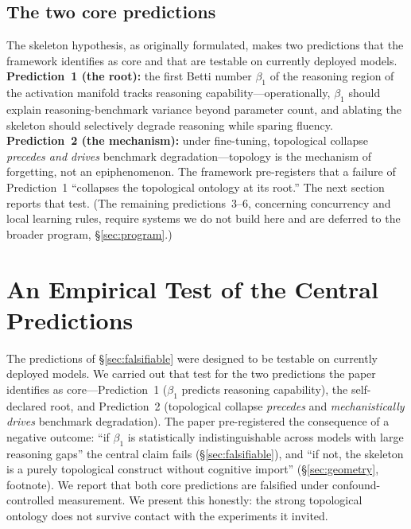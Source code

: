 \documentclass{article}
\begin{document}
\subsection{The two core predictions}
\label{sec:geometry-predictions}
The skeleton hypothesis, as originally formulated, makes two predictions that the framework
identifies as core and that are testable on currently deployed models. \textbf{Prediction~1 (the
root):} the first Betti number $\beta_1$ of the reasoning region of the activation manifold tracks
reasoning capability---operationally, $\beta_1$ should explain reasoning-benchmark variance beyond
parameter count, and ablating the skeleton should selectively degrade reasoning while sparing fluency.
\textbf{Prediction~2 (the mechanism):} under fine-tuning, topological collapse \emph{precedes and
drives} benchmark degradation---topology is the mechanism of forgetting, not an epiphenomenon. The
framework pre-registers that a failure of Prediction~1 ``collapses the topological ontology at its
root.'' The next section reports that test. (The remaining predictions~3--6, concerning concurrency
and local learning rules, require systems we do not build here and are deferred to the broader program,
\S\ref{sec:program}.)

\section{An Empirical Test of the Central Predictions}
\label{sec:empirical}

The predictions of \S\ref{sec:falsifiable} were designed to be testable on currently
deployed models. We carried out that test for the two predictions the paper identifies as
core---Prediction~1 (\(\beta_1\) predicts reasoning capability), the self-declared root, and
Prediction~2 (topological collapse \emph{precedes} and \emph{mechanistically drives} benchmark
degradation). The paper pre-registered the consequence of a negative outcome: ``if \(\beta_1\)
is statistically indistinguishable across models with large reasoning gaps'' the central claim
fails (\S\ref{sec:falsifiable}), and ``if not, the skeleton is a purely topological construct
without cognitive import'' (\S\ref{sec:geometry}, footnote). We report that both core
predictions are falsified under confound-controlled measurement. We present this honestly: the
strong topological ontology does not survive contact with the experiments it invited.
\end{document}
